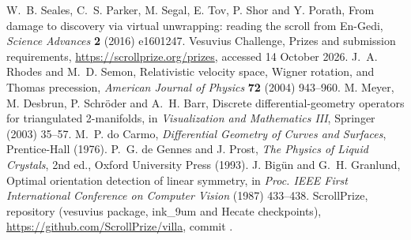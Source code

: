  W.~B. Seales, C.~S. Parker, M. Segal, E. Tov, P. Shor and Y. Porath, From damage to discovery via virtual unwrapping: reading the scroll from En-Gedi, \emph{Science Advances} \textbf{2} (2016) e1601247.
 Vesuvius Challenge, Prizes and submission requirements, \url{https://scrollprize.org/prizes}, accessed 14 October 2026.
 J.~A. Rhodes and M.~D. Semon, Relativistic velocity space, Wigner rotation, and Thomas precession, \emph{American Journal of Physics} \textbf{72} (2004) 943--960.
 M. Meyer, M. Desbrun, P. Schr\"oder and A.~H. Barr, Discrete differential-geometry operators for triangulated 2-manifolds, in \emph{Visualization and Mathematics III}, Springer (2003) 35--57.
 M.~P. do Carmo, \emph{Differential Geometry of Curves and Surfaces}, Prentice-Hall (1976).
 P.~G. de Gennes and J. Prost, \emph{The Physics of Liquid Crystals}, 2nd ed., Oxford University Press (1993).
 J. Big\"un and G.~H. Granlund, Optimal orientation detection of linear symmetry, in \emph{Proc. IEEE First International Conference on Computer Vision} (1987) 433--438.
 ScrollPrize,  repository (vesuvius package, ink\_9um and Hecate checkpoints), \url{https://github.com/ScrollPrize/villa}, commit .
